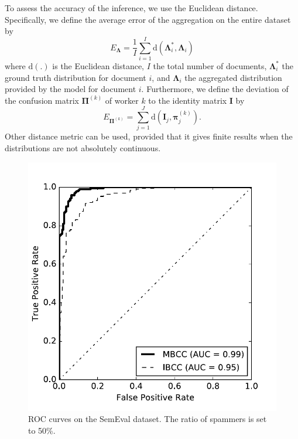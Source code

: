 \documentclass{article}
\begin{document}
\label{sub:4.4-Accuracy-Metric}



To assess the accuracy of the inference, we use the Euclidean distance.
Specifically, we define the average error of the aggregation on the
entire dataset by 
\begin{equation}
E_{\boldsymbol{\Lambda}}=\frac{1}{I}\sum_{i=1}^{I}\mathrm{d}\left(\boldsymbol{\Lambda}_{i}^{*},\boldsymbol{\Lambda}_{i}\right)\label{eq:error-dist}
\end{equation}
where $\mathrm{d}\left(.\right)$ is the Euclidean distance, $I$
the total number of documents, $\boldsymbol{\Lambda}_{i}^{*}$
the ground truth distribution for document $i$, and $\boldsymbol{\Lambda}_{i}$
the aggregated distribution provided by the model for document $i$.
Furthermore, we define the deviation of the confusion matrix $\boldsymbol{\Pi}^{(k)}$
of worker $k$ to the identity matrix $\mathbf{I}$ by 
\begin{equation}
E_{\boldsymbol{\Pi}^{(k)}}=\sum_{j=1}^{J}\mathrm{d}\left(\mathbf{I}_{j},\boldsymbol{\pi}_{j}^{(k)}\right).\label{eq:error-cm}
\end{equation}
Other distance metric can be used, provided that it gives finite
results when the distributions are not absolutely continuous. 
\begin{figure}[t]
\begin{centering}
\includegraphics[scale=0.48]{res/semeval2007_roc_sr_1}
\par\end{centering}

\protect\caption{\label{fig:ROC}ROC curves on the SemEval dataset. The ratio of spammers
is set to 50\%. }
\end{figure}
\end{document}
